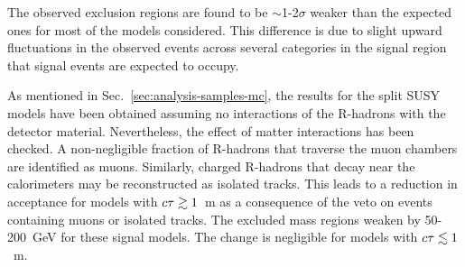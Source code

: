 The observed exclusion regions are found to be $\sim$1-2$\sigma$ weaker than 
the expected ones for most of the models considered. This difference is due to 
slight upward fluctuations in the observed events across several categories in 
the signal region that signal events are expected to occupy.

As mentioned in Sec.~\ref{sec:analysis-samples-mc}, the results for the split 
SUSY models have been obtained assuming no interactions of the R-hadrons with 
the detector material. Nevertheless, the effect of matter interactions has been 
checked. A 
non-negligible fraction of R-hadrons that traverse the muon chambers 
are identified as muons. Similarly, charged R-hadrons that decay near the 
calorimeters may be reconstructed as isolated tracks. This leads to a 
reduction in acceptance for models with $c\tau \gtrsim 1$~m as a consequence of 
the veto on events containing muons or isolated tracks.
The excluded mass regions weaken by 50-200~GeV for these signal models. The 
change is negligible for models with $c\tau \lesssim 1$~m.

